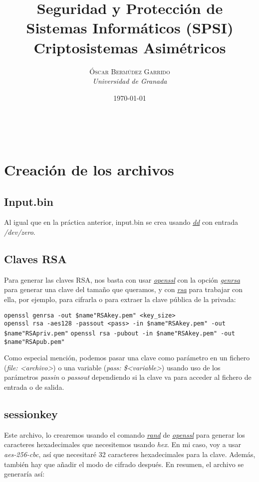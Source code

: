 \documentclass[a4paper, 11pt]{article}
\title{\textbf{Seguridad y Protección de Sistemas Informáticos (SPSI)}\\ %
Criptosistemas Asimétricos} %
\author{\textsc{Óscar Bermúdez Garrido} %
\\{\textit{Universidad de Granada}}} %
\date{\today} %
\makeatletter
\renewcommand{\maketitle}{
  \begin{flushright} %
  
  {\LARGE\@title} %
  
  \vspace{50pt} %
  
  {\large\@author} %
  \\\@date %
  \vspace{40pt} %
  \end{flushright}
}
\makeatother
\begin{document}
\maketitle %

\renewcommand{\abstractname}{Resumen} %

{\parskip=2pt
  \tableofcontents
}
\pagebreak


\section{Creación de los archivos}
	\subsection{Input.bin}
		Al igual que en la práctica anterior, input.bin se crea usando \href{http://manpages.ubuntu.com/manpages/zesty/en/man1/dd.1.html}
		{\textit{dd}} con entrada \textit{/dev/zero}.
		
	\subsection{Claves RSA}
		Para generar las claves RSA, nos basta con usar \href{http://manpages.ubuntu.com/manpages/zesty/en/man1/openssl.1ssl.html}
		{\textit{openssl}} con la opción \href{https://www.openssl.org/docs/man1.0.2/apps/genrsa.html}{\textit{genrsa}} para
		generar una clave del tamaño que queramos, y con \href{https://www.openssl.org/docs/man1.0.2/apps/rsa.html}{\textit{rsa}}
		para trabajar con ella, por ejemplo, para cifrarla o para extraer la clave pública de la privada:
		\begin{small}
			\verb|openssl genrsa -out $name"RSAkey.pem" <key_size>| \\
			\verb|openssl rsa -aes128 -passout <pass> -in $name"RSAkey.pem" -out $name"RSApriv.pem"|
			\verb|openssl rsa -pubout -in $name"RSAkey.pem" -out $name"RSApub.pem"|
		\end{small}
		
		Como especial mención, podemos pasar una clave como parámetro en un fichero (\textit{file: <archivo>}) o una variable
		(\textit{pass: \$<variable>}) usando uso de los parámetros \textit{passin} o \textit{passout} dependiendo si la clave
		va para acceder al fichero de entrada o de salida.
		
	\subsection{sessionkey}
	    Este archivo, lo crearemos usando el comando \href{https://www.openssl.org/docs/man1.0.2/apps/rand.html}{\textit{rand}} de \href{http://manpages.ubuntu.com/manpages/zesty/en/man1/openssl.1ssl.html}{\textit{openssl}} para generar los caracteres
	    hexadecimales que necesitemos usando \textit{hex}. En mi caso, voy a usar \textit{aes-256-cbc}, así que necesitaré 32
	    caracteres hexadecimales para la clave. Además, también hay que añadir el modo de cifrado después. En resumen, el archivo
	    se generaría así:
		
\end{document}

